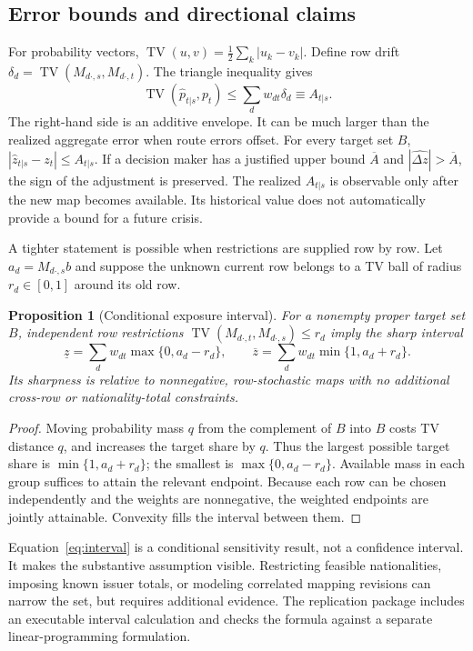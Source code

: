 \documentclass[11pt,a4paper]{article}
\newtheorem{proposition}{Proposition}
\newcommand{\TV}{\operatorname{TV}}
\begin{document}
\subsection{Error bounds and directional claims}
For probability vectors, $\TV(u,v)=\frac12\sum_k|u_k-v_k|$. Define row drift $\delta_d=\TV(M_{d\cdot,s},M_{d\cdot,t})$. The triangle inequality gives
\begin{equation}
 \TV(\widehat p_{t|s},p_t)\leq
 \sum_d w_{dt}\delta_d\equiv A_{t|s}.
 \label{eq:envelope}
\end{equation}
The right-hand side is an additive envelope. It can be much larger than the realized aggregate error when route errors offset. For every target set $B$, $|\widehat z_{t|s}-z_t|\leq A_{t|s}$. If a decision maker has a justified upper bound $\overline A$ and $|\widehat{\Delta z}|>\overline A$, the sign of the adjustment is preserved. The realized $A_{t|s}$ is observable only after the new map becomes available. Its historical value does not automatically provide a bound for a future crisis.

A tighter statement is possible when restrictions are supplied row by row. Let $a_d=M_{d\cdot,s}b$ and suppose the unknown current row belongs to a TV ball of radius $r_d\in[0,1]$ around its old row.

\begin{proposition}[Conditional exposure interval]
For a nonempty proper target set $B$, independent row restrictions $\TV(M_{d\cdot,t},M_{d\cdot,s})\leq r_d$ imply the sharp interval
\begin{equation}
 \underline z=\sum_d w_{dt}\max\{0,a_d-r_d\},\qquad
 \overline z=\sum_d w_{dt}\min\{1,a_d+r_d\}.
 \label{eq:interval}
\end{equation}
Its sharpness is relative to nonnegative, row-stochastic maps with no additional cross-row or nationality-total constraints.
\end{proposition}
\begin{proof}
Moving probability mass $q$ from the complement of $B$ into $B$ costs TV distance $q$, and increases the target share by $q$. Thus the largest possible target share is $\min\{1,a_d+r_d\}$; the smallest is $\max\{0,a_d-r_d\}$. Available mass in each group suffices to attain the relevant endpoint. Because each row can be chosen independently and the weights are nonnegative, the weighted endpoints are jointly attainable. Convexity fills the interval between them.
\end{proof}

Equation~\eqref{eq:interval} is a conditional sensitivity result, not a confidence interval. It makes the substantive assumption visible. Restricting feasible nationalities, imposing known issuer totals, or modeling correlated mapping revisions can narrow the set, but requires additional evidence. The replication package includes an executable interval calculation and checks the formula against a separate linear-programming formulation.
\end{document}
